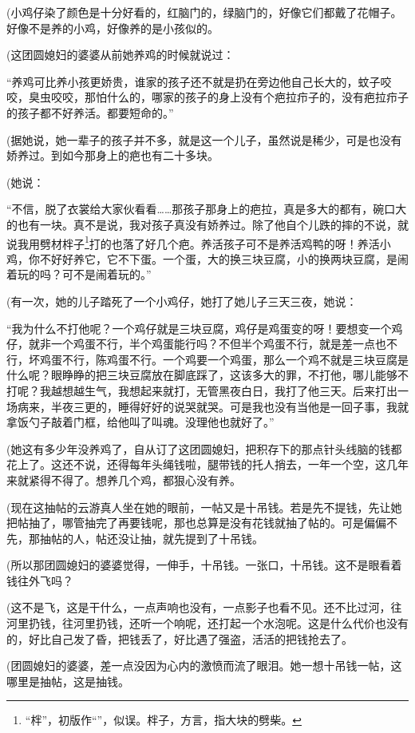 \par (小鸡仔染了颜色是十分好看的，红脑门的，绿脑门的，好像它们都戴了花帽子。好像不是养的小鸡，好像养的是小孩似的。
\par (这团圆媳妇的婆婆从前她养鸡的时候就说过：
\par “养鸡可比养小孩更娇贵，谁家的孩子还不就是扔在旁边他自己长大的，蚊子咬咬，臭虫咬咬，那怕什么的，哪家的孩子的身上没有个疤拉疖子的，没有疤拉疖子的孩子都不好养活。都要短命的。”
\par (据她说，她一辈子的孩子并不多，就是这一个儿子，虽然说是稀少，可是也没有娇养过。到如今那身上的疤也有二十多块。
\par (她说：
\par “不信，脱了衣裳给大家伙看看……那孩子那身上的疤拉，真是多大的都有，碗口大的也有一块。真不是说，我对孩子真没有娇养过。除了他自个儿跌的摔的不说，就说我用劈材柈子\footnote{“柈”，初版作“”，似误。柈子，方言，指大块的劈柴。}打的也落了好几个疤。养活孩子可不是养活鸡鸭的呀！养活小鸡，你不好好养它，它不下蛋。一个蛋，大的换三块豆腐，小的换两块豆腐，是闹着玩的吗？可不是闹着玩的。”
\par (有一次，她的儿子踏死了一个小鸡仔，她打了她儿子三天三夜，她说：
\par “我为什么不打他呢？一个鸡仔就是三块豆腐，鸡仔是鸡蛋变的呀！要想变一个鸡仔，就非一个鸡蛋不行，半个鸡蛋能行吗？不但半个鸡蛋不行，就是差一点也不行，坏鸡蛋不行，陈鸡蛋不行。一个鸡要一个鸡蛋，那么一个鸡不就是三块豆腐是什么呢？眼睁睁的把三块豆腐放在脚底踩了，这该多大的罪，不打他，哪儿能够不打呢？我越想越生气，我想起来就打，无管黑夜白日，我打了他三天。后来打出一场病来，半夜三更的，睡得好好的说哭就哭。可是我也没有当他是一回子事，我就拿饭勺子敲着门框，给他叫了叫魂。没理他也就好了。”
\par (她这有多少年没养鸡了，自从订了这团圆媳妇，把积存下的那点针头线脑的钱都花上了。这还不说，还得每年头绳钱啦，腿带钱的托人捎去，一年一个空，这几年来就紧得不得了。想养几个鸡，都狠心没有养。
\par (现在这抽帖的云游真人坐在她的眼前，一帖又是十吊钱。若是先不提钱，先让她把帖抽了，哪管抽完了再要钱呢，那也总算是没有花钱就抽了帖的。可是偏偏不先，那抽帖的人，帖还没让抽，就先提到了十吊钱。
\par (所以那团圆媳妇的婆婆觉得，一伸手，十吊钱。一张口，十吊钱。这不是眼看着钱往外飞吗？
\par (这不是飞，这是干什么，一点声响也没有，一点影子也看不见。还不比过河，往河里扔钱，往河里扔钱，还听一个响呢，还打起一个水泡呢。这是什么代价也没有的，好比自己发了昏，把钱丢了，好比遇了强盗，活活的把钱抢去了。
\par (团圆媳妇的婆婆，差一点没因为心内的激愤而流了眼泪。她一想十吊钱一帖，这哪里是抽帖，这是抽钱。

